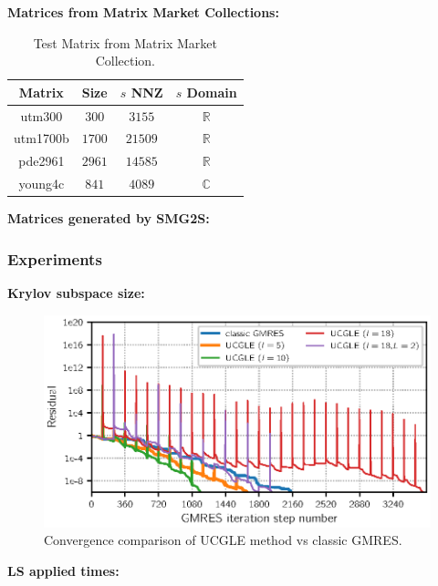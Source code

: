 \textbf{Matrices from Matrix Market Collections: }
\begin{table}[htbp]
	\renewcommand{\arraystretch}{1.4}
	\small	
	\caption{Test Matrix from Matrix Market Collection.}
	\label{testmatrixforparameters}
	\centering
	\begin{tabular}{c|c|c|c}
		\toprule
		Matrix  & Size & $s$ NNZ & $s$ Domain\\
		\midrule
		utm300  & $300$ & $3155$ &$\mathbb{R}$ \\
		utm1700b & $1700$ & $21509$  & $\mathbb{R}$ \\
		pde2961 & $2961$ & $14585$& $\mathbb{R}$ \\
		young4c & $841$ & $4089$& $\mathbb{C}$ \\
		\bottomrule
	\end{tabular}
\end{table}

\textbf{Matrices generated by SMG2S: }

\subsubsection{Experiments}

\textbf{Krylov subspace size: }

\begin{figure}[htbp]
	\centering
	\includegraphics[width=6.2in]{fig/conv2.eps}
	\caption{Convergence comparison of UCGLE method vs classic GMRES.}
	\label{fig:krylovsubspace}
\end{figure}

\textbf{LS applied times: }

